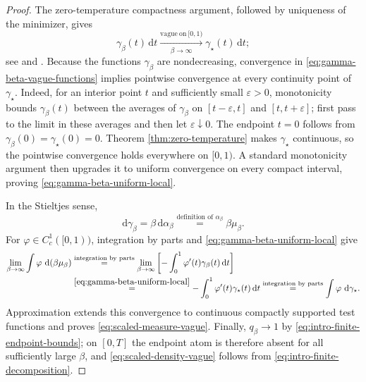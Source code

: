 \documentclass[10pt]{amsart}
\theoremstyle{definition}
\theoremstyle{remark}
\numberwithin{equation}{section}
\newcommand{\1}{\mathbf 1}
\newcommand{\dd}{\,\mathrm d}
\newcommand{\stackref}[2]{\stackrel{#2}{#1}}
\begin{document}
\begin{proof}
The zero-temperature compactness argument, followed by uniqueness of the minimizer, gives
\begin{equation}
 \gamma_\beta(t)\dd t
 \xrightarrow[\beta\to\infty]{\mathrm{vague\ on}\ [0,1)}
 \gamma_\star(t)\dd t;
 \label{eq:gamma-beta-vague-functions}
\end{equation}
see \cite[proof of Theorem 2]{AuffingerChenZeng} and \cite[Lemma 3]{AuffingerChenGroundState}.  Because the functions $\gamma_\beta$ are nondecreasing, convergence in \eqref{eq:gamma-beta-vague-functions} implies pointwise convergence at every continuity point of $\gamma_\star$.  Indeed, for an interior point $t$ and sufficiently small $\varepsilon>0$, monotonicity bounds $\gamma_\beta(t)$ between the averages of $\gamma_\beta$ on $[t-\varepsilon,t]$ and $[t,t+\varepsilon]$; first pass to the limit in these averages and then let $\varepsilon\downarrow0$.  The endpoint $t=0$ follows from $\gamma_\beta(0)=\gamma_\star(0)=0$.  Theorem \ref{thm:zero-temperature} makes $\gamma_\star$ continuous, so the pointwise convergence holds everywhere on $[0,1)$.  A standard monotonicity argument then upgrades it to uniform convergence on every compact interval, proving \eqref{eq:gamma-beta-uniform-local}.

In the Stieltjes sense,
\begin{equation*}
 \mathrm d\gamma_\beta=\beta\,\mathrm d\alpha_\beta
 \stackref{=}{\text{definition of }\alpha_\beta}
 \beta\mu_\beta.
\end{equation*}
For $\varphi\in C_c^1([0,1))$, integration by parts and \eqref{eq:gamma-beta-uniform-local} give
\begin{align*}
 \lim_{\beta\to\infty}\int\varphi\,\dd(\beta\mu_\beta)
 &\stackref{=}{\text{integration by parts}}
 \lim_{\beta\to\infty}\left[-\int_0^1\varphi'(t)\gamma_\beta(t)\dd t\right]
 \\
 &\stackref{=}{\eqref{eq:gamma-beta-uniform-local}}
 -\int_0^1\varphi'(t)\gamma_\star(t)\dd t
 \stackref{=}{\text{integration by parts}}
 \int\varphi\,\dd\gamma_\star.
\end{align*}
Approximation extends this convergence to continuous compactly supported test functions and proves \eqref{eq:scaled-measure-vague}. Finally, $q_\beta\to1$ by \eqref{eq:intro-finite-endpoint-bounds}; on $[0,T]$ the endpoint atom is therefore absent for all sufficiently large $\beta$, and \eqref{eq:scaled-density-vague} follows from \eqref{eq:intro-finite-decomposition}.
\end{proof}
\end{document}
